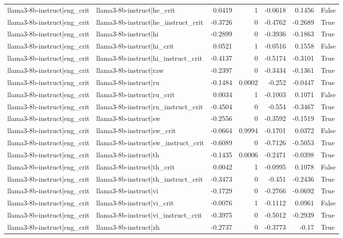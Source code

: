\begin{table}
\begin{tabular}{l l r r r r l}
llama3-8b-instruct|eng_crit & llama3-8b-instruct|he_crit & 0.0419 & 1 & -0.0618 & 0.1456 & False \\
llama3-8b-instruct|eng_crit & llama3-8b-instruct|he_instruct_crit & -0.3726 & 0 & -0.4762 & -0.2689 & True \\
llama3-8b-instruct|eng_crit & llama3-8b-instruct|hi & -0.2899 & 0 & -0.3936 & -0.1863 & True \\
llama3-8b-instruct|eng_crit & llama3-8b-instruct|hi_crit & 0.0521 & 1 & -0.0516 & 0.1558 & False \\
llama3-8b-instruct|eng_crit & llama3-8b-instruct|hi_instruct_crit & -0.4137 & 0 & -0.5174 & -0.3101 & True \\
llama3-8b-instruct|eng_crit & llama3-8b-instruct|raw & -0.2397 & 0 & -0.3434 & -0.1361 & True \\
llama3-8b-instruct|eng_crit & llama3-8b-instruct|ru & -0.1484 & 0.0002 & -0.252 & -0.0447 & True \\
llama3-8b-instruct|eng_crit & llama3-8b-instruct|ru_crit & 0.0034 & 1 & -0.1003 & 0.1071 & False \\
llama3-8b-instruct|eng_crit & llama3-8b-instruct|ru_instruct_crit & -0.4504 & 0 & -0.554 & -0.3467 & True \\
llama3-8b-instruct|eng_crit & llama3-8b-instruct|sw & -0.2556 & 0 & -0.3592 & -0.1519 & True \\
llama3-8b-instruct|eng_crit & llama3-8b-instruct|sw_crit & -0.0664 & 0.9994 & -0.1701 & 0.0372 & False \\
llama3-8b-instruct|eng_crit & llama3-8b-instruct|sw_instruct_crit & -0.6089 & 0 & -0.7126 & -0.5053 & True \\
llama3-8b-instruct|eng_crit & llama3-8b-instruct|th & -0.1435 & 0.0006 & -0.2471 & -0.0398 & True \\
llama3-8b-instruct|eng_crit & llama3-8b-instruct|th_crit & 0.0042 & 1 & -0.0995 & 0.1078 & False \\
llama3-8b-instruct|eng_crit & llama3-8b-instruct|th_instruct_crit & -0.3473 & 0 & -0.451 & -0.2436 & True \\
llama3-8b-instruct|eng_crit & llama3-8b-instruct|vi & -0.1729 & 0 & -0.2766 & -0.0692 & True \\
llama3-8b-instruct|eng_crit & llama3-8b-instruct|vi_crit & -0.0076 & 1 & -0.1112 & 0.0961 & False \\
llama3-8b-instruct|eng_crit & llama3-8b-instruct|vi_instruct_crit & -0.3975 & 0 & -0.5012 & -0.2939 & True \\
llama3-8b-instruct|eng_crit & llama3-8b-instruct|zh & -0.2737 & 0 & -0.3773 & -0.17 & True \\

\end{tabular}
\end{table}
